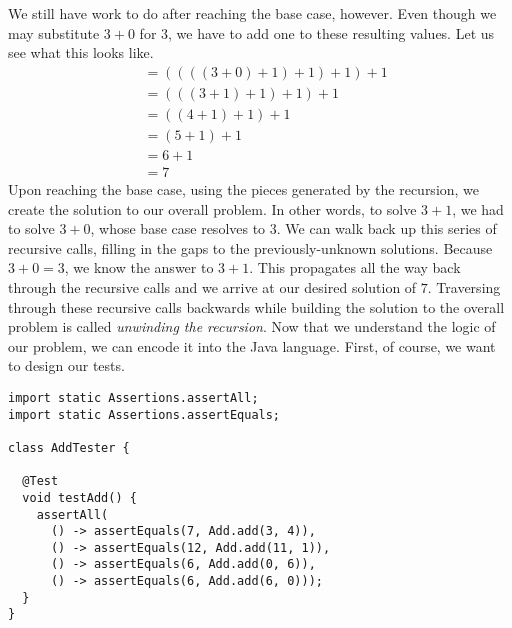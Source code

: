 We still have work to do after reaching the base case, however. Even though we may substitute $3+0$ for $3$, we have to add one to these resulting values. Let us see what this looks like.
\begin{align*}
    &= ((((3 + 0) + 1) + 1) + 1) + 1\\
    &= (((3 + 1) + 1) + 1) + 1\\
    &= ((4 + 1) + 1) + 1\\
    &= (5 + 1) + 1\\
    &= 6 + 1\\
    &= 7
\end{align*}
Upon reaching the base case, using the pieces generated by the recursion, we create the solution to our overall problem. In other words, to solve $3 + 1$, we had to solve $3 + 0$, whose base case resolves to $3$. We can walk back up this series of recursive calls, filling in the gaps to the previously-unknown solutions. Because $3 + 0 = 3$, we know the answer to $3 + 1$. This propagates all the way back through the recursive calls and we arrive at our desired solution of $7$. Traversing through these recursive calls backwards while building the solution to the overall problem is called \emph{unwinding the recursion}. Now that we understand the logic of our problem, we can encode it into the Java language. First, of course, we want to design our tests.


\begin{lstlisting}[language=MyJava]
import static Assertions.assertAll;
import static Assertions.assertEquals;

class AddTester {
  
  @Test
  void testAdd() {
    assertAll(
      () -> assertEquals(7, Add.add(3, 4)),
      () -> assertEquals(12, Add.add(11, 1)),
      () -> assertEquals(6, Add.add(0, 6)),
      () -> assertEquals(6, Add.add(6, 0)));
  }
}
\end{lstlisting}

